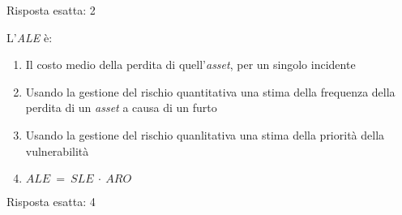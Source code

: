 \begin{Answer} [
  ref={gestRisk9},
  number={9}
  ]

  \Question Risposta esatta: 2

\end{Answer}



\begin{Exercise} [
  title={Quiz},
  label={gestRisk10}
  ]

  \Question L'\textit{ALE} \`e:
\begin{enumerate}
 \item Il costo medio della perdita di quell'\textit{asset}, per un singolo
incidente
 \item Usando la gestione del rischio quantitativa una stima della frequenza
della perdita di un \textit{asset} a causa di un furto
 \item Usando la gestione del rischio quanlitativa una stima della priorit\`a
della vulnerabilit\`a
 \item $ALE\ =\ SLE\ \cdot\ ARO$
\end{enumerate}

\end{Exercise}


\begin{Answer} [
  ref={gestRisk10},
  number={10}
  ]

  \Question Risposta esatta: 4

\end{Answer}
